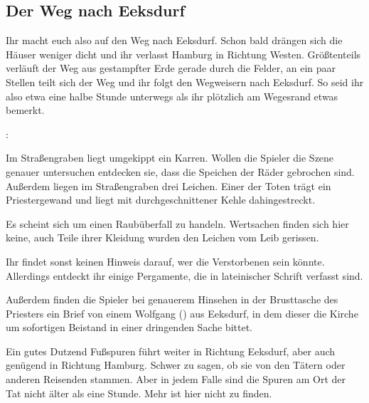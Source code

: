 
\subsection*{Der Weg nach Eeksdurf}
\label{nachxd}

Ihr macht euch also auf den Weg nach Eeksdurf. Schon bald drängen sich die Häuser weniger dicht und ihr verlasst Hamburg in Richtung Westen. Größtenteils verläuft der Weg aus gestampfter Erde gerade durch die Felder, an ein paar Stellen teilt sich der Weg und ihr folgt den Wegweisern nach Eeksdurf. So seid ihr also etwa eine halbe Stunde unterwegs als ihr plötzlich am Wegesrand etwas bemerkt.

:

Im Straßengraben liegt umgekippt ein Karren. Wollen die Spieler die Szene genauer untersuchen entdecken sie, dass die Speichen der Räder gebrochen sind. Außerdem liegen im Straßengraben drei Leichen. Einer der Toten trägt ein Priestergewand und liegt mit durchgeschnittener Kehle dahingestreckt.


Es scheint sich um einen Raubüberfall zu handeln. Wertsachen finden sich hier keine, auch Teile ihrer Kleidung wurden den Leichen vom Leib gerissen.



Ihr findet sonst keinen Hinweis darauf, wer die Verstorbenen sein könnte. Allerdings entdeckt ihr einige Pergamente, die in lateinischer Schrift verfasst sind.


Außerdem finden die Spieler bei genauerem Hinsehen in der Brusttasche des Priesters ein Brief von einem Wolfgang (\blue{\ref{Wolfgang}}) aus Eeksdurf, in dem dieser die Kirche um sofortigen Beistand in einer dringenden Sache bittet.

Ein gutes Dutzend Fußspuren führt weiter in Richtung Eeksdurf, aber auch genügend in Richtung Hamburg. Schwer zu sagen, ob sie von den Tätern oder anderen Reisenden stammen. Aber in jedem Falle sind die Spuren am Ort der Tat nicht älter als eine Stunde. Mehr ist hier nicht zu finden.


